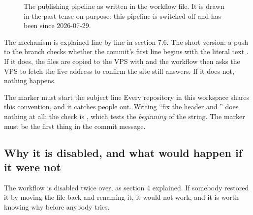 \documentclass[11pt,a4paper]{article}
\begin{document}
\begin{figure}[H]\centering
{}
\caption{The publishing pipeline as written in the workflow file. It is drawn in
the past tense on purpose: this pipeline is switched off and has been since
2026-07-29.}
\end{figure}

The mechanism is explained line by line in section 7.6. The short version: a
push to the  branch checks whether the commit's first line begins with
the literal text \code{[deploy]}. If it does, the files are copied to the VPS with
 and the workflow then asks the VPS to fetch the live address to
confirm the site still answers. If it does not, nothing happens.

\begin{keyidea}{The \code{[deploy]} marker must start the subject line}
Every repository in this workspace shares this convention, and it catches people
out. Writing ``fix the header and \code{[deploy]}'' does nothing at all: the check
is , which tests the \emph{beginning} of the
string. The marker must be the first thing in the commit message.
\end{keyidea}

\subsection{Why it is disabled, and what would happen if it were not}

The workflow is disabled twice over, as section 4 explained. If somebody restored
it by moving the file back and renaming it, it would not work, and it is worth
knowing why before anybody tries.
\end{document}
